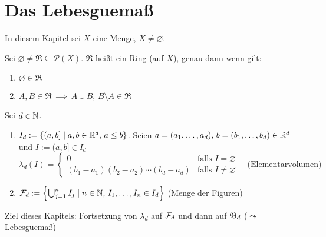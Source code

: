 \documentclass[a4paper,twoside,DIV15,BCOR12mm,chapterprefix=true,headings=onelinechapter]{scrbook}
\begin{document}
\chapter{Das Lebesguema\ss}
In diesem Kapitel sei \(X\) eine Menge, \(X\neq\varnothing\).
\begin{definition}
Sei \(\varnothing\neq\mathfrak{R}\subseteq\mathcal{P}(X)\). \(\mathfrak{R}\)
hei\ss t ein Ring (auf \(X\)), genau dann wenn gilt:
\begin{enumerate}
\item \(\varnothing\in\mathfrak{R}\)
\item \(A,B\in\mathfrak{R}\,\implies\,A\cup B,\,B\setminus A\in\mathfrak{R}\)
\end{enumerate}
\end{definition}
\begin{definition}
Sei \(d\in\mathbb{N}\).
\begin{enumerate}
\item \(I_{d}:=\{(a,b]\mid a,b\in\mathbb{R}^{d},\,a\leq b\}\).
Seien \(a=(a_{1},\ldots,a_{d}),\,b=(b_{1},\ldots,b_{d})\in\mathbb{R}^d\) und \(I:=(a,b]\in I_{d}\)
\[
\lambda_{d}(I)=\begin{cases}0&\text{falls }I=\varnothing\\(b_{1}-a_{1})(b_{2}-a_{2})\cdots(b_{d}-a_{d})&\text{falls }I\neq\varnothing\end{cases}\quad\text{(Elementarvolumen)}
\]
\item \(\mathcal{F}_d:=\left\{\bigcup_{j=1}^{n}I_{j}\mid n\in\mathbb{N},\,I_{1},\ldots,I_{n}\in I_{d}\right\}\) (Menge der Figuren)
\end{enumerate}
\end{definition}
Ziel dieses Kapitels: Fortsetzung von \(\lambda_{d}\) auf \(\mathcal{F}_{d}\) und dann auf \(\mathfrak{B}_d\) (\(\leadsto\) Lebesguema\ss)
\end{document}
